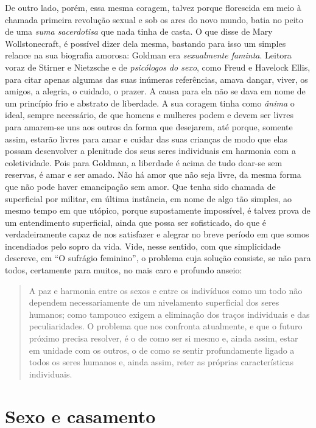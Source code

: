 De outro lado, porém, essa mesma coragem, talvez porque florescida em
meio à chamada primeira revolução sexual e sob os ares do novo mundo,
batia no peito de uma \textit{suma sacerdotisa} que nada tinha de casta. O que
disse de Mary Wollstonecraft, é possível dizer dela mesma, bastando para
isso um simples relance na sua biografia amorosa: Goldman era
\textit{sexualmente faminta}. Leitora voraz de Stirner e Nietzsche e de
\textit{psicólogos do sexo}, como Freud e Havelock Ellis, para citar apenas
algumas das suas inúmeras referências, amava dançar, viver, os amigos, a
alegria, o cuidado, o prazer. A causa para ela não se dava em nome de um
princípio frio e abstrato de liberdade. A sua coragem tinha como
\textit{ânima} o ideal, sempre necessário, de que homens e mulheres podem e
devem ser livres para amarem-se uns aos outros da forma que desejarem,
até porque, somente assim, estarão livres para amar e cuidar das suas
crianças de modo que elas possam desenvolver a plenitude dos seus seres
individuais em harmonia com a coletividade. Pois para Goldman, a
liberdade é acima de tudo doar-se sem reservas, é amar e ser amado. Não
há amor que não seja livre, da mesma forma que não pode haver
emancipação sem amor. Que tenha sido chamada de superficial por militar,
em última instância, em nome de algo tão simples, ao mesmo tempo em que
utópico, porque supostamente impossível, é talvez prova de um
entendimento superficial, ainda que possa ser sofisticado, do que é
verdadeiramente capaz de nos satisfazer e alegrar no breve período em
que somos incendiados pelo sopro da vida. Vide, nesse sentido, com que
simplicidade descreve, em ``O sufrágio feminino'', o problema cuja
solução consiste, se não para todos, certamente para muitos, no mais
caro e profundo anseio:

\begin{quote}
A paz e harmonia entre os sexos e entre os indivíduos como um todo não
dependem necessariamente de um nivelamento superficial dos seres
humanos; como tampouco exigem a eliminação dos traços individuais e das
peculiaridades. O problema que nos confronta atualmente, e que o futuro
próximo precisa resolver, é o de como ser si mesmo e, ainda assim, estar
em unidade com os outros, o de como se sentir profundamente ligado a
todos os seres humanos e, ainda assim, reter as próprias características
individuais.
\end{quote}

\section{Sexo e casamento}

